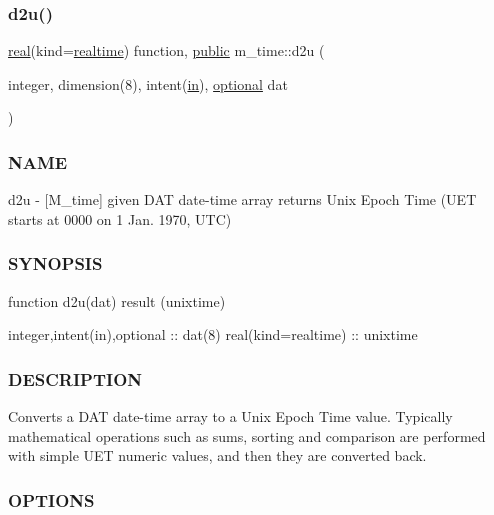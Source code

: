 \subsubsection{\texorpdfstring{d2u()}{d2u()}}
{\footnotesize\ttfamily \hyperlink{read__watch_83_8txt_abdb62bde002f38ef75f810d3a905a823}{real}(kind=\hyperlink{namespacem__time_ac10ea9e8d59ec74eaa7d89f2517d7422}{realtime}) function, \hyperlink{M__stopwatch_83_8txt_a2f74811300c361e53b430611a7d1769f}{public} m\+\_\+time\+::d2u (\begin{DoxyParamCaption}\item[{integer, dimension(8), intent(\hyperlink{M__journal_83_8txt_afce72651d1eed785a2132bee863b2f38}{in}), \hyperlink{option__stopwatch_83_8txt_aa4ece75e7acf58a4843f70fe18c3ade5}{optional}}]{dat }\end{DoxyParamCaption})}



\subsubsection*{N\+A\+ME}

d2u -\/ \mbox{[}M\+\_\+time\mbox{]} given D\+AT date-\/time array returns Unix Epoch Time (U\+ET starts at 0000 on 1 Jan. 1970, U\+TC) 

\subsubsection*{S\+Y\+N\+O\+P\+S\+IS}

\begin{DoxyVerb}function d2u(dat) result (unixtime)

   integer,intent(in),optional :: dat(8)
   real(kind=realtime)         :: unixtime
\end{DoxyVerb}


\subsubsection*{D\+E\+S\+C\+R\+I\+P\+T\+I\+ON}

Converts a D\+AT date-\/time array to a Unix Epoch Time value. Typically mathematical operations such as sums, sorting and comparison are performed with simple U\+ET numeric values, and then they are converted back.

\subsubsection*{O\+P\+T\+I\+O\+NS}

